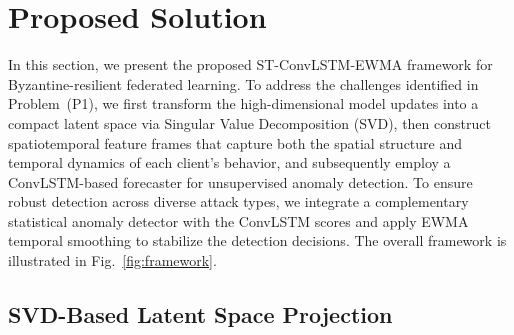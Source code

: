 \section{Proposed Solution}\label{sec:proposed_solution}

In this section, we present the proposed ST-ConvLSTM-EWMA framework for Byzantine-resilient federated learning. To address the challenges identified in Problem~(P1), we first transform the high-dimensional model updates into a compact latent space via Singular Value Decomposition (SVD), then construct spatiotemporal feature frames that capture both the spatial structure and temporal dynamics of each client's behavior, and subsequently employ a ConvLSTM-based forecaster for unsupervised anomaly detection. To ensure robust detection across diverse attack types, we integrate a complementary statistical anomaly detector with the ConvLSTM scores and apply EWMA temporal smoothing to stabilize the detection decisions. The overall framework is illustrated in Fig.~\ref{fig:framework}.

\subsection{SVD-Based Latent Space Projection}\label{subsec:svd_projection}

